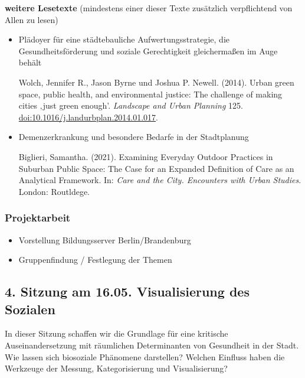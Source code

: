 \documentclass[
  ngerman,
]{article}
\providecommand{\tightlist}{%
  \setlength{\itemsep}{0pt}\setlength{\parskip}{0pt}}
\begin{document}
\textbf{weitere Lesetexte}
(mindestens einer dieser Texte zusätzlich verpflichtend von Allen zu lesen)

\begin{itemize}
\item
  Plädoyer für eine städtebauliche Aufwertungsstrategie, die Gesundheitsförderung und soziale Gerechtigkeit gleichermaßen im Auge behält

  Wolch, Jennifer R., Jason Byrne und Joshua P. Newell. (2014). Urban green space, public health, and environmental justice: The challenge of making cities ‚just green enough'. \emph{Landscape and Urban Planning} 125. \url{doi:10.1016/j.landurbplan.2014.01.017}.
\item
  Demenzerkrankung und besondere Bedarfe in der Stadtplanung

  Biglieri, Samantha. (2021). Examining Everyday Outdoor Practices in Suburban Public Space: The Case for an Expanded Definition of Care as an Analytical Framework. In: \emph{Care and the City. Encounters with Urban Studies}. London: Routldege.
\end{itemize}

\hypertarget{projektarbeit-1}{%
\subsubsection*{Projektarbeit}\label{projektarbeit-1}}

\begin{itemize}
\tightlist
\item
  Vorstellung Bildungsserver Berlin/Brandenburg
\item
  Gruppenfindung / Festlegung der Themen
\end{itemize}

\hypertarget{sitzung-am-16.05.-visualisierung-des-sozialen}{%
\subsection*{4. Sitzung am 16.05. \textbar{} Visualisierung des Sozialen}\label{sitzung-am-16.05.-visualisierung-des-sozialen}}

In dieser Sitzung schaffen wir die Grundlage für eine kritische Auseinandersetzung mit räumlichen Determinanten von Gesundheit in der Stadt. Wie lassen sich biosoziale Phänomene darstellen? Welchen Einfluss haben die Werkzeuge der Messung, Kategorisierung und Visualisierung?
\end{document}
